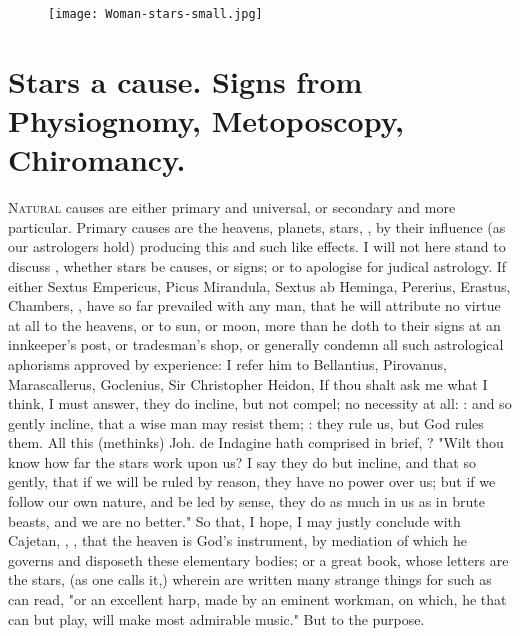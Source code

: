 \cleartoleftpage{}
\begin{figure}[p]
  \begingroup
  \centering
  \texttt{[image: Woman-stars-small.jpg]}
  \label{fig:womanstars}
\end{figure}

\clearpage{}
\thispagestyle{titleontop}

\section[Heavens, Planets, Stars]{Stars a cause. Signs from Physiognomy, Metoposcopy, Chiromancy.}\label{sec:heavens-planets-stars}

\lettrine{N}{atural} causes are either primary and universal, or secondary and
more particular. Primary causes are the heavens, planets, stars, \etc{}, by
their influence (as our astrologers hold) producing this and such like effects.
I will not here stand to discuss , whether stars be causes, or
signs; or to apologise for judical astrology. If either Sextus Empericus, Picus
Mirandula, Sextus ab Heminga, Pererius, Erastus, Chambers, \etc{}, have so far
prevailed with any man, that he will attribute no virtue at all to the heavens,
or to sun, or moon, more than he doth to their signs at an innkeeper's post, or
tradesman's shop, or generally condemn all such astrological aphorisms approved
by experience: I refer him to Bellantius, Pirovanus, Marascallerus, Goclenius,
Sir Christopher Heidon, \etc{} If thou shalt ask me what I think, I must
answer,  they do incline, but not compel; no necessity at
all: : and so gently incline, that a
wise man may resist them; : they rule us, but
God rules them. All this (methinks) Joh. de Indagine hath
comprised in brief, ? \etc{}
"Wilt thou know how far the stars work upon us? I say they do but incline, and
that so gently, that if we will be ruled by reason, they have no power over us;
but if we follow our own nature, and be led by sense, they do as much in us as
in brute beasts, and we are no better." So that, I hope, I may justly conclude
with Cajetan, ,
\etc{}, that the heaven is God's instrument, by mediation of which he governs
and disposeth these elementary bodies; or a great book, whose letters are the
stars, (as one calls it,) wherein are written many strange things for such as
can read, "or an excellent harp, made by an eminent
workman, on which, he that can but play, will make most admirable music." But
to the purpose.

